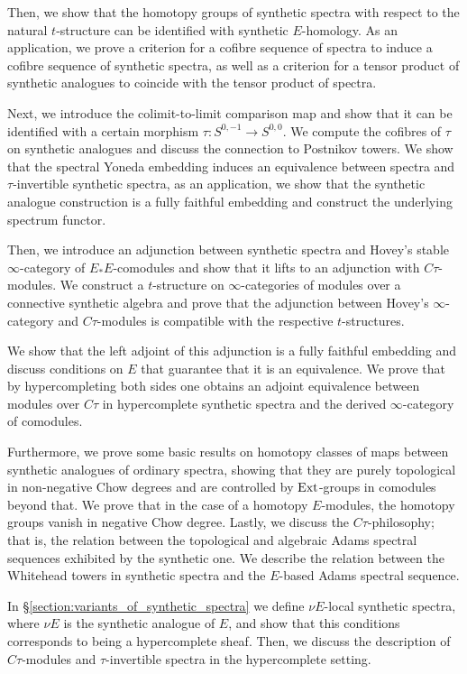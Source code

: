 \documentclass[oneside,a4paper]{amsart}
\newcommand{\Ext}{\textnormal{Ext}} %
\theoremstyle{plain}
\theoremstyle{definition}
\theoremstyle{remark}
\begin{document}
Then, we show that the homotopy groups of synthetic spectra with respect to the natural $t$-structure can be identified with synthetic $E$-homology. As an application, we prove a criterion for a cofibre sequence of spectra to induce a cofibre sequence of synthetic spectra, as well as a criterion for a tensor product of synthetic analogues to coincide with the tensor product of spectra. 

Next, we introduce the colimit-to-limit comparison map and show that it can be identified with a certain morphism $\tau\colon S^{0, -1} \rightarrow S^{0, 0}$. We compute the cofibres of $\tau$ on synthetic analogues and discuss the connection to Postnikov towers. We show that the spectral Yoneda embedding induces an equivalence between spectra and $\tau$-invertible synthetic spectra, as an application, we show that the synthetic analogue construction is a fully faithful embedding and construct the underlying spectrum functor.

Then, we introduce an adjunction between synthetic spectra and Hovey's stable $\infty$-category of $E_{*}E$-comodules and show that it lifts to an adjunction with $C\tau$-modules. We construct a $t$-structure on $\infty$-categories of modules over a connective synthetic algebra and prove that the adjunction between Hovey's $\infty$-category and $C\tau$-modules is compatible with the respective $t$-structures. 

We show that the left adjoint of this adjunction is a fully faithful embedding and discuss conditions on $E$ that guarantee that it is an equivalence. We prove that by hypercompleting both sides one obtains an adjoint equivalence between modules over $C\tau$ in hypercomplete synthetic spectra and the derived $\infty$-category of comodules. 

Furthermore, we prove some basic results on homotopy classes of maps between  synthetic analogues of ordinary spectra, showing that they are purely topological in non-negative Chow degrees and are controlled by $\Ext$-groups in comodules beyond that. We prove that in the case of a homotopy $E$-modules, the homotopy groups vanish in negative Chow degree. Lastly, we discuss the $C\tau$-philosophy; that is, the relation between the topological and algebraic Adams spectral sequences exhibited by the synthetic one. We describe the relation between the Whitehead towers in synthetic spectra and the $E$-based Adams spectral sequence. 

In \S\ref{section:variants_of_synthetic_spectra} we define $\nu E$-local synthetic spectra, where $\nu E$ is the synthetic analogue of $E$, and show that this conditions corresponds to being a hypercomplete sheaf. Then, we discuss the description of $C\tau$-modules and $\tau$-invertible spectra in the hypercomplete setting. 
\end{document}
